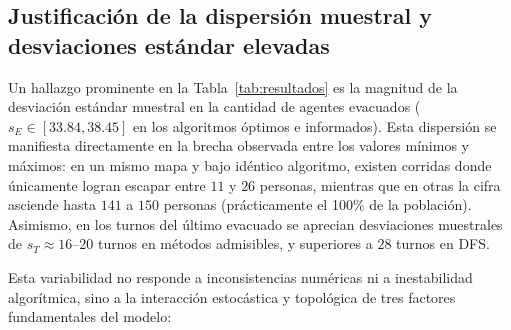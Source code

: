 \documentclass[11pt,letterpaper]{article}
\begin{document}
\subsection{Justificación de la dispersión muestral y desviaciones estándar elevadas}
Un hallazgo prominente en la Tabla~\ref{tab:resultados} es la magnitud de la desviación estándar muestral en la cantidad de agentes evacuados ($s_E \in [33.84, 38.45]$ en los algoritmos óptimos e informados). Esta dispersión se manifiesta directamente en la brecha observada entre los valores mínimos y máximos: en un mismo mapa y bajo idéntico algoritmo, existen corridas donde únicamente logran escapar entre $11$ y $26$ personas, mientras que en otras la cifra asciende hasta $141$ a $150$ personas (prácticamente el 100\% de la población). Asimismo, en los turnos del último evacuado se aprecian desviaciones muestrales de $s_T \approx 16$--$20$ turnos en métodos admisibles, y superiores a $28$ turnos en DFS.

Esta variabilidad no responde a inconsistencias numéricas ni a inestabilidad algorítmica, sino a la interacción estocástica y topológica de tres factores fundamentales del modelo:
\end{document}
